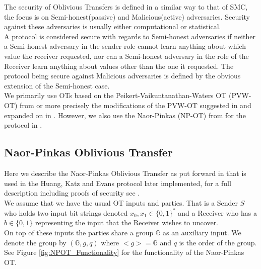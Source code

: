 \documentclass[ %
                    author={Nicholas Tutte},
                supervisor={Prof. Nigel Smart},
                    degree={MEng},
                     title={Secure Two Party Computation},
                  subtitle={A practical comparison of recent protocols},
                      type={Research - GG1K},
                      year={2015} ]{dissertation}
\begin{document}
			The security of Oblivious Transfers is defined in a similar way to that of SMC, the focus is on Semi-honest(passive) and Malicious(active) adversaries. Security against these adversaries is usually either computational or statistical.\\

			A protocol is considered secure with regards to Semi-honest adversaries if neither a Semi-honest adversary in the sender role cannot learn anything about which value the receiver requested, nor can a Semi-honest adversary in the role of the Receiver learn anything about values other than the one it requested. The protocol being secure against Malicious adversaries is defined by the obvious extension of the Semi-honest case.\\

			We primarily use OTs based on the Peikert-Vaikuntanathan-Waters OT (PVW-OT) from \cite{PVW_OT_2008} or more precisely the modifications of the PVW-OT suggested in \cite{LindellAndPinkas2011} and expanded on in \cite{Lindell_CnC_2013}. However, we also use the Naor-Pinkas (NP-OT) from \cite{NaorPinkasOT2001} for the protocol in \cite{Katz_Symm_CnC_2013}.


			\subsection{Naor-Pinkas Oblivious Transfer} \label{sub:NaorPinkasOT}

				Here we describe the Naor-Pinkas Oblivious Transfer as put forward in \cite{Katz_Symm_CnC_2013} that is used in the Huang, Katz and Evans protocol later implemented, for a full description including proofs of security see \cite{NaorPinkasOT2001}.\\

				We assume that we have the usual OT inputs and parties. That is a Sender $S$ who holds two input bit strings denoted $x_0, x_1 \in \{0, 1\}^*$ and a Receiver who has a $b \in \{0, 1\}$ representing the  input that the Receiver wishes to uncover.\\

				On top of these inputs the parties share a group $\mathbb{G}$ as an auxiliary input. We denote the group by $(\mathbb{G}, g, q)$ where $<g> = \mathbb{G}$ and $q$ is the order of the group.\\ %

				See Figure \ref{fig:NPOT_Functionality} for the functionality of the Naor-Pinkas OT.\\
\end{document}
